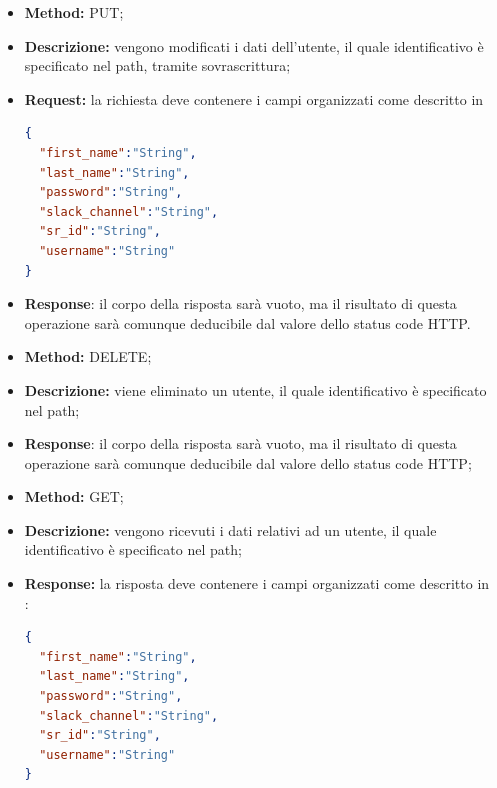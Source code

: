 \begin{itemize}
\begin{itemize}
\item \textbf{Method:} PUT;
\item \textbf{Descrizione:} vengono modificati i dati dell'utente, il quale identificativo è specificato nel path, tramite sovrascrittura;
\item \textbf{Request:} la richiesta deve contenere i campi organizzati come descritto in \\
\begin{lstlisting}[language=json,firstnumber=1]
{
  "first_name":"String",
  "last_name":"String",
  "password":"String",
  "slack_channel":"String",
  "sr_id":"String",
  "username":"String"
}
\end{lstlisting}
\item \textbf{Response}: il corpo della risposta sarà vuoto, ma il risultato di questa operazione sarà comunque deducibile dal valore dello status code HTTP.
\end{itemize}

\begin{itemize}
\item \textbf{Method:} DELETE;
\item \textbf{Descrizione:} viene eliminato un utente, il quale identificativo è specificato nel path;
\item \textbf{Response}: il corpo della risposta sarà vuoto, ma il risultato di questa operazione sarà comunque deducibile dal valore dello status code HTTP;
\end{itemize}

\begin{itemize}
\item \textbf{Method:} GET;
\item \textbf{Descrizione:} vengono ricevuti i dati relativi ad un utente, il quale identificativo è specificato nel path;
\item \textbf{Response:} la risposta deve contenere i campi organizzati come descritto in \\:
\begin{lstlisting}[language=json,firstnumber=1]
{
  "first_name":"String",
  "last_name":"String",
  "password":"String",
  "slack_channel":"String",
  "sr_id":"String",
  "username":"String"
}
\end{lstlisting}
\end{itemize}

\end{itemize}

